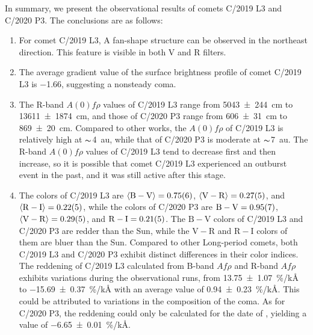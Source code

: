 In summary, we present the observational results of comets C/2019 L3 and C/2020 P3. The conclusions are as follows: 
\begin{enumerate}
    \item For comet C/2019 L3, A fan-shape structure can be observed in the northeast direction. This feature is visible in both V and R filters. 
    \item The average gradient value  of the surface brightness profile of comet C/2019 L3 is \num{-1.66}, suggesting a nonsteady coma. 
    \item The R-band $A(0)f\rho$ values of C/2019 L3 range from {\qty{5043 +- 244}{\cm}} to {\qty{13611 +- 1874}{\cm}}, and those of C/2020 P3 range from {\qty{606 +- 31}{\cm}} to {\qty{869 +- 20}{\cm}}. Compared to other works, the $A(0)f\rho$ of C/2019 L3 is relatively high at $\thicksim${\qty{4}{\astronomicalunit}}, while that of C/2020 P3 is moderate at $\thicksim${\qty{7}{\astronomicalunit}}. The R-band $A(0)f\rho$ values of C/2019 L3 tend to decrease first and then increase, so it is possible that comet C/2019 L3 experienced an outburst event in the past, and it was still active after this stage. 
    \item The colors of C/2019 L3 are  
        $\langle \mathrm{B-V} \rangle = \num{0.75 +- 0.06}$, 
        $\langle \mathrm{V-R} \rangle = \num{0.27 +- 0.05}$, and 
        $\langle \mathrm{R-I} \rangle = \num{0.22 +- 0.05}$,  
        while the colors of C/2020 P3 are 
        $\mathrm{B-V} = \num{0.95 +- 0.07}$, 
        $\langle \mathrm{V-R} \rangle = \num{0.29 +- 0.05}$, and 
        $\mathrm{R-I} = \num{0.21 +- 0.05}$. 
        The $\mathrm{B-V}$ colors of C/2019 L3 and C/2020 P3 are redder than the Sun, while the $\mathrm{V-R}$ and $\mathrm{R-I}$ colors of them are bluer than the Sun. Compared to other Long-period comets, both C/2019 L3 and C/2020 P3 exhibit distinct differences in their color indices. The reddening of C/2019 L3 calculated from B-band $Af\rho$ and R-band $Af\rho$ exhibits variations during the observational runs, from {\qty{13.75 +- 1.07}{\percent/\kilo\angstrom}} to {\qty{-15.69 +- 0.37}{\percent/\kilo\angstrom}} with an average value of {\qty{0.94 +- 0.23}{\percent/\kilo\angstrom}}. This could be attributed to  variations in the composition of the coma. As for C/2020 P3, the reddening could only be calculated for the date of , yielding a value of {\qty{-6.65 +- 0.01}{\percent/\kilo\angstrom}}. 
\end{enumerate}
